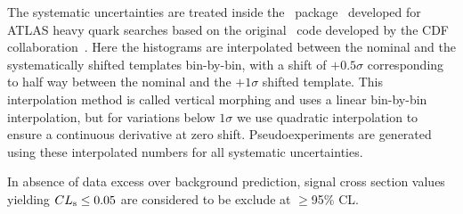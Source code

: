 The systematic uncertainties are treated inside the \mclimit\ 
package~\cite{mclimitATLAS} developed for ATLAS heavy quark
searches based on the original \mclimit\ code developed
by the CDF collaboration~\cite{Heinrich:7587,Junk:8128,Junk:7904}.
Here the  histograms are interpolated between the nominal and the 
systematically shifted templates bin-by-bin, with a shift of $+0.5\sigma$
corresponding to half way between the nominal and the $+1\sigma$ shifted template.
This interpolation method is called vertical morphing and uses a linear 
bin-by-bin interpolation, but for variations below $1\sigma$ we use
quadratic interpolation to ensure a continuous derivative at zero shift.
Pseudoexperiments are generated using these interpolated numbers for
all systematic uncertainties.


In absence of data excess over background prediction, 
signal cross section
values yielding
$\cls{s}\leq 0.05$ are considered to be exclude
at $\geq$95\% CL.

